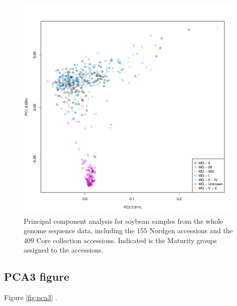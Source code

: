\documentclass[9pt, onecolumn,twoside]{gsajnl}
\begin{document}
\begin{figure}[t]
\centering
\includegraphics[width=\linewidth]{plot_PCA_mg1.pdf}
\caption{Principal component analysis for soybean samples from the whole genome sequence data, including the 155 Nordgen accessions and the 409 Core collection accessions. Indicated is the Maturity groups assigned to the accessions.}
\label{fig:pca2}
\end{figure}


\subsection{PCA3 figure}


Figure \ref{fig:pca3} .
\end{document}

